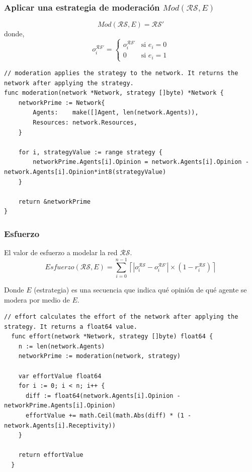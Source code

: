 \documentclass[letterpaper,10pt]{article}
\begin{document}
\subsubsection*{Aplicar una estrategia de moderación $Mod(\mathcal{R}\mathcal{S},E)$}
\begin{equation}
  Mod(\mathcal{R}\mathcal{S}, E) = \mathcal{R}\mathcal{S}'
\end{equation}\label{eq:mod}
donde,
\begin{equation}
  o_i^{\mathcal{R}\mathcal{S}'} = 
  \begin{cases} 
        o_i^{\mathcal{R}\mathcal{S}'} & \text{si } e_i = 0 \\
        0        & \text{si } e_i = 1 
  \end{cases}
  \label{eq:mod_opinion}
\end{equation}

\begin{lstlisting}[caption={Implementación del Mod}, label={lst:mod}]
// moderation applies the strategy to the network. It returns the network after applying the strategy.
func moderation(network *Network, strategy []byte) *Network {
	networkPrime := Network{
		Agents:    make([]Agent, len(network.Agents)),
		Resources: network.Resources,
	}

	for i, strategyValue := range strategy {
		networkPrime.Agents[i].Opinion = network.Agents[i].Opinion - network.Agents[i].Opinion*int8(strategyValue)
	}

	return &networkPrime
}
\end{lstlisting}

\subsubsection*{Esfuerzo}
El valor de esfuerzo a modelar la red $\mathcal{R}\mathcal{S}$.
\begin{equation}
  Esfuerzo(\mathcal{R}\mathcal{S}, E) = \sum_{i=0}^{n-1} \left\lceil  |o_i^{\mathcal{R}\mathcal{S}} - o_i^{\mathcal{R}\mathcal{S}'}| \times (1 - r_i^{\mathcal{R}\mathcal{S}}) \right\rceil
  \label{eq:esfuerzo}
\end{equation}

Donde $E$ (estrategia) es una secuencia que indica qué opinión de qué agente se modera por medio de $E$.
\begin{lstlisting}[caption={Implementación del esfuerzo}, label={lst:esfuerzo}]
  // effort calculates the effort of the network after applying the strategy. It returns a float64 value.
  func effort(network *Network, strategy []byte) float64 {
    n := len(network.Agents)
    networkPrime := moderation(network, strategy)
  
    var effortValue float64
    for i := 0; i < n; i++ {
      diff := float64(network.Agents[i].Opinion - networkPrime.Agents[i].Opinion)
      effortValue += math.Ceil(math.Abs(diff) * (1 - network.Agents[i].Receptivity))
    }
  
    return effortValue
  }
\end{lstlisting}
\end{document}
